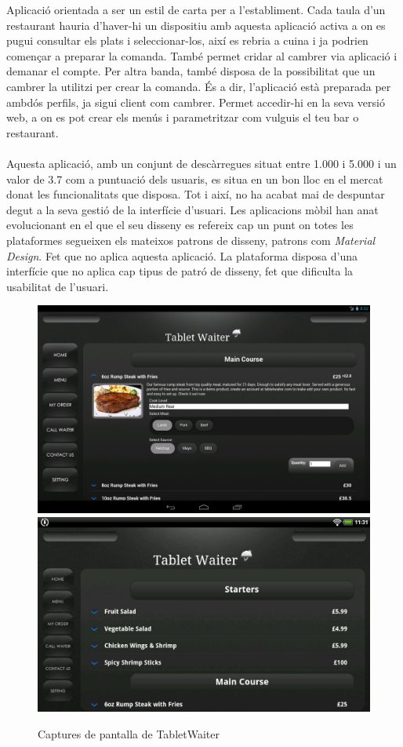 Aplicació\cite{tabletwaiter} orientada a ser un estil de carta per a l'establiment. Cada taula d'un restaurant hauria d'haver-hi un dispositiu amb aquesta aplicació activa a on es pugui consultar els plats i seleccionar-los, així es rebria a cuina i ja podrien començar a preparar la comanda. També permet cridar al cambrer via aplicació i demanar el compte. Per altra banda, també disposa de la possibilitat que un cambrer la utilitzi per crear la comanda. És a dir, l'aplicació està preparada per ambdós perfils, ja sigui client com cambrer. Permet accedir-hi en la seva versió web, a on es pot crear els menús i parametritzar com vulguis el teu bar o restaurant.
\\\\
Aquesta aplicació, amb un conjunt de descàrregues situat entre 1.000 i 5.000 i un valor de 3.7 com a puntuació dels usuaris, es situa en un bon lloc en el mercat donat les funcionalitats que disposa. Tot i així, no ha acabat mai de despuntar degut a la seva gestió de la interfície d'usuari. Les aplicacions mòbil han anat evolucionant en el que el seu disseny es refereix cap un punt on totes les plataformes segueixen els mateixos patrons de disseny, patrons com \textit{Material Design}\cite{materialdesign}. Fet que no aplica aquesta aplicació. La plataforma disposa d'una interfície que no aplica cap tipus de patró de disseny, fet que dificulta la usabilitat de l'usuari.
\\
\begin{figure}[H]
\centering
\includegraphics[scale=0.15]{Figures/tabletwaiter-1.png}
\includegraphics[scale=0.20]{Figures/tabletwaiter-2.png}
\caption{Captures de pantalla de TabletWaiter}
\end{figure}

